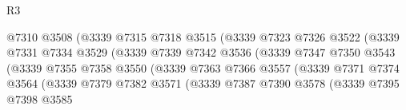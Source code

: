 \begin{lexlean}{R3}
\begin{coremodule}
                                        @7310
                                        @3508
                                        (@3339
                                          @7315
                                          @7318
                                          @3515
                                          (@3339
                                            @7323
                                            @7326
                                            @3522
                                            (@3339
                                              @7331
                                              @7334
                                              @3529
                                              (@3339
                                                @7339
                                                @7342
                                                @3536
                                                (@3339
                                                  @7347
                                                  @7350
                                                  @3543
                                                  (@3339
                                                    @7355
                                                    @7358
                                                    @3550
                                                    (@3339
                                                      @7363
                                                      @7366
                                                      @3557
                                                      (@3339
                                                        @7371
                                                        @7374
                                                        @3564
                                                        (@3339
                                                          @7379
                                                          @7382
                                                          @3571
                                                          (@3339
                                                            @7387
                                                            @7390
                                                            @3578
                                                            (@3339
                                                              @7395
                                                              @7398
                                                              @3585

\end{coremodule}
\end{lexlean}

